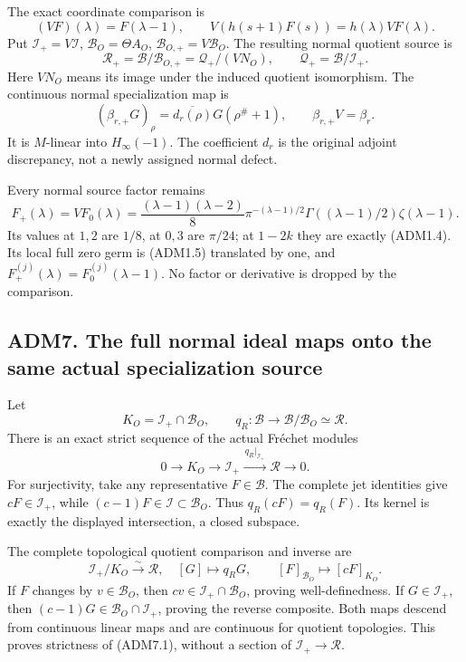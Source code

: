The exact coordinate comparison is \[
(VF)(\lambda)=F(\lambda-1),\qquad
V(h(s+1)F(s))=h(\lambda)VF(\lambda).
\tag{ADM6.8}
\] Put \(\mathcal I_+=V\mathcal I\), \(\mathcal B_O=\Theta A_O\),
\(\mathcal B_{O,+}=V\mathcal B_O\). The resulting normal quotient source
is \[
\mathcal R_+=\mathcal B/\mathcal B_{O,+}
=\mathcal Q_+/(V N_O),\qquad \mathcal Q_+=\mathcal B/\mathcal I_+.
\tag{ADM6.9}
\] Here \(V N_O\) means its image under the induced quotient
isomorphism. The continuous normal specialization map is \[
(\beta_{r,+}G)_\rho
=\overline{d_r(\rho)}G(\rho^\#+1),\qquad
\beta_{r,+}V=\beta_r .
\tag{ADM6.10}
\] It is \(M\)-linear into \(H_\infty(-1)\). The coefficient \(d_r\) is
the original adjoint discrepancy, not a newly assigned normal defect.

Every normal source factor remains \[
F_+(\lambda)=VF_0(\lambda)
=\frac{(\lambda-1)(\lambda-2)}8\pi^{-(\lambda-1)/2}
\Gamma((\lambda-1)/2)\zeta(\lambda-1).
\tag{ADM6.11}
\] Its values at \(1,2\) are \(1/8\), at \(0,3\) are \(\pi/24\); at
\(1-2k\) they are exactly (ADM1.4). Its local full zero germ is (ADM1.5)
translated by one, and \(F_+^{(j)}(\lambda)=F_0^{(j)}(\lambda-1)\). No
factor or derivative is dropped by the comparison.

\subsection{ADM7. The full normal ideal maps onto the same actual
specialization
source}\label{adm7.-the-full-normal-ideal-maps-onto-the-same-actual-specialization-source}

Let \[
K_O=\mathcal I_+\cap\mathcal B_O,\qquad
q_R:\mathcal B\to\mathcal B/\mathcal B_O\simeq\mathcal R.
\] There is an exact strict sequence of the actual Fréchet modules \[
\boxed{\quad
0\to K_O\to\mathcal I_+\xrightarrow{\,q_R|_{\mathcal I_+}\,}
\mathcal R\to0.
\quad}
\tag{ADM7.1}
\] For surjectivity, take any representative \(F\in\mathcal B\). The
complete jet identities give \(cF\in\mathcal I_+\), while
\((c-1)F\in\mathcal I\subset\mathcal B_O\). Thus \(q_R(cF)=q_R(F)\). Its
kernel is exactly the displayed intersection, a closed subspace.

The complete topological quotient comparison and inverse are \[
\mathcal I_+/K_O\xrightarrow{\sim}\mathcal R,\quad
[G]\mapsto q_R G,\qquad
[F]_{\mathcal B_O}\mapsto[cF]_{K_O}.
\tag{ADM7.2}
\] If \(F\) changes by \(v\in\mathcal B_O\), then
\(cv\in\mathcal I_+\cap\mathcal B_O\), proving well-definedness. If
\(G\in\mathcal I_+\), then \((c-1)G\in\mathcal B_O\cap\mathcal I_+\),
proving the reverse composite. Both maps descend from continuous linear
maps and are continuous for quotient topologies. This proves strictness
of (ADM7.1), without a section of \(\mathcal I_+\to\mathcal R\).

